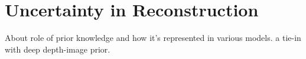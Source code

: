 \section{Uncertainty in Reconstruction}
\label{sec:uncertainty_reconstruction}

About role of prior knowledge and how it's represented in various models. a tie-in with deep depth-image prior.

